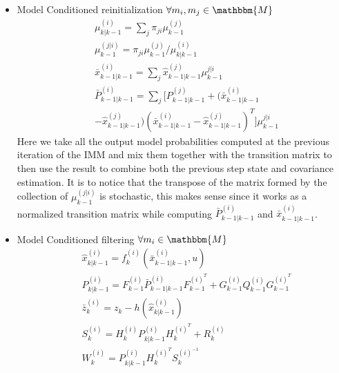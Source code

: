 \documentclass[twocolumn]{article}
\begin{document}
\begin{itemize}
    \item Model Conditioned reinitialization $\forall m_{i},m_{j}\in \mathbbm{M}$
          \begin{align*}
               & \mu^{(i)}_{k|k-1}=\sum_{j}\pi_{ji}\mu^{(j)}_{k-1}                                              \\
               & \mu^{(j|i)}_{k-1}=\pi_{ji}\mu^{(j)}_{k-1}/\mu^{(i)}_{k|k-1}                                    \\
               & \bar{x}^{(i)}_{k-1|k-1}=\sum_{j}\hat{x}^{(j)}_{k-1|k-1}\mu^{j|i}_{k-1}                         \\
               & \bar{P}^{(i)}_{k-1|k-1}=\sum_{j}[P^{(j)}_{k-1|k-1}+(\bar{x}^{(i)}_{k-1|k-1}                    \\
               & -\hat{x}^{(j)}_{k-1|k-1})(\bar{x}^{(i)}_{k-1|k-1}-\hat{x}^{(j)}_{k-1|k-1})^{T}]\mu_{k-1}^{j|i}
          \end{align*}
          Here we take all the output model probabilities computed at the previous iteration of the IMM and mix them together with the
          transition matrix to then use the result to combine both the previous step state and covariance estimation. It is to 
          notice that the transpose of the matrix formed by the collection of $\mu^{(j|i)}_{k-1}$ is stochastic, this makes sense
          since it works as a normalized transition matrix while computing $\bar{P}^{(i)}_{k-1|k-1}$ and $\bar{x}^{(i)}_{k-1|k-1}$.
    \item Model Conditioned filtering $\forall m_{i}\in \mathbbm{M}$
          \begin{align*}
               & \hat{x}^{(i)}_{k|k-1}=f^{(i)}_{k}(\bar{x}^{(i)}_{k-1|k-1},u)                                                        \\
               & P^{(i)}_{k|k-1}=F^{(i)}_{k-1}\bar{P}^{(i)}_{k-1|k-1}F^{(i)^{T}}_{k-1}+G^{(i)}_{k-1}Q_{k-1}^{(i)}G^{(i)^{T}}_{k-1} \\
               & \bar{z}^{(i)}_{k}=z_{k}-h(\hat{x}^{(i)}_{k|k-1})                                                                  \\
               & S^{(i)}_{k}=H^{(i)}_{k}P^{(i)}_{k|k-1}H^{(i)^{T}}_{k}+R^{(i)}_{k}                                                 \\
               & W^{(i)}_{k}=P^{(i)}_{k|k-1}H^{(i)^{T}}_{k}S^{(i)^{-1}}_{k}                                                        \\

\end{align*}
\end{itemize}
\end{document}
